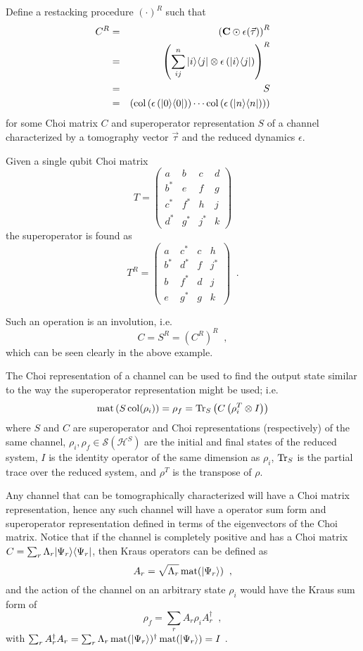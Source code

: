 Define a restacking procedure $(\cdot)^R$ such that
\begin{eqnarray*}
C^R &=& \left(\mathbf{C}\odot\epsilon(\vec{\tau})\right)^R \\
&=& \left(\sum_{ij}^n |i\rangle\langle j| \otimes \epsilon\left( |i\rangle\langle j| \right)\right)^R\\
&=& S \\
&=& \left(\operatorname{col}\left( \epsilon\left( |0\rangle\langle0| \right)\right) \cdots \operatorname{col}\left( \epsilon\left( |n\rangle\langle n| \right)\right) \right)
\end{eqnarray*}
for some Choi matrix $C$ and superoperator representation $S$ of a channel characterized by a tomography vector $\vec{\tau}$ and the reduced dynamics $\epsilon$.  
\begin{example}
Given a single qubit Choi matrix
$$
T = \begin{pmatrix}
a  &b  &c  &d\\
b^*&e  &f  &g\\
c^*&f^*&h  &j\\
d^*&g^*&j^*&k
\end{pmatrix}   
$$
the superoperator is found as
$$
T^R = \begin{pmatrix}
a  &c^*&c  &h\\
b^*&d^*&f  &j^*\\
b  &f^*&d  &j\\
e  &g^*&g  &k
\end{pmatrix}\;\;.
$$
\end{example}
Such an operation is an involution, i.e.\
$$
C = S^R = (C^R)^R\;\;,
$$
which can be seen clearly in the above example.

The Choi representation of a channel can be used to find the output state similar to the way the superoperator representation might be used; i.e. \cite{Paris2004}\
$$
\operatorname{mat}\left(S\operatorname{col}(\rho_i)\right) = \rho_f = \operatorname{Tr}_S\left(C\left(\rho_i^T\otimes I\right)\right)
$$
where $S$ and $C$ are superoperator and Choi representations (respectively) of the same channel, $\rho_i,\rho_f\in\mathcal{S}(\mathcal{H}^S)$ are the initial and final states of the reduced system, $I$ is the identity operator of the same dimension as $\rho_{i}$, $\operatorname{Tr}_S$ is the partial trace over the reduced system, and $\rho^T$ is the transpose of $\rho$.  

Any channel that can be tomographically characterized will have a Choi matrix representation, hence any such channel will have a operator sum form and superoperator representation defined in terms of the eigenvectors of the Choi matrix.  Notice that if the channel is completely positive and has a Choi matrix $C=\sum_r \Lambda_r |\Psi_r\rangle\langle\Psi_r|$, then Kraus operators can be defined as
$$
A_r = \sqrt{\Lambda_r} \operatorname{mat}(\left|\Psi_r\right\rangle)\;\;,
$$
and the action of the channel on an arbitrary state $\rho_i$ would have the Kraus sum form of
$$
\rho_f = \sum_r A_r \rho_i A_r^\dagger\;\;,
$$
with $\sum_r A_r^\dagger A_r = \sum_r \Lambda_r \operatorname{mat}(\left|\Psi_r\right\rangle)^\dagger \operatorname{mat}(\left|\Psi_r\right\rangle) = I$ \cite{Havel2003}.

